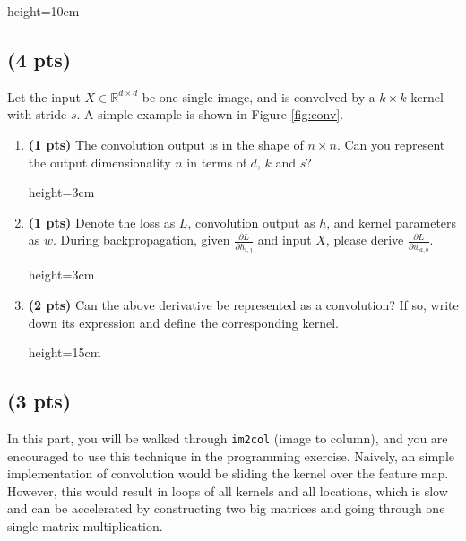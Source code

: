 \begin{soln}{height=10cm}
\FourA
\end{soln}
    

\subsection{(4 pts)} 

Let the input $X \in \mathbb{R}^{d\times d} $ be one single image, and is convolved by a $k\times k$ kernel with stride $s$. A simple example is shown in Figure \ref{fig:conv}.


\begin{enumerate}[label=\alph*.]
\item \textbf{(1 pts)} The convolution output is in the shape of $n\times n$. Can you represent the output dimensionality $n$ in terms of $d$, $k$ and $s$?

\begin{soln}{height=3cm}
\FourBA
\end{soln}
    
\item \textbf{(1 pts)} Denote the loss as $L$, convolution output as $h$, and kernel parameters as $w$. During backpropagation, given $\frac{\partial L}{\partial h_{i, j}}$ and input $X$, please derive $\frac{\partial L}{\partial w_{a, b}}$.

\begin{soln}{height=3cm}
\FourBB
\end{soln}

\pagebreak 
\item \textbf{(2 pts)} Can the above derivative be represented as a convolution? If so, write down its expression and define the corresponding kernel.

\begin{soln}{height=15cm}
\FourBC
\end{soln}

\end{enumerate}


\pagebreak

\subsection{(3 pts)}
In this part, you will be walked through \texttt{im2col} (image to column), and you are encouraged to use this technique in the programming exercise. Naively, an simple implementation of convolution would be sliding the kernel over the feature map. However, this would result in loops of all kernels and all locations, which is slow and can be accelerated by constructing two big matrices and going through one single matrix multiplication.

